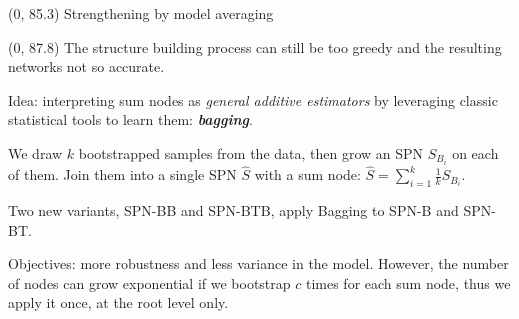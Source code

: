\documentclass[final]{beamer}
\begin{document}
\begin{frame}{}
  
  
  \begin{textblock}{80}(0, 85.3)
    Strengthening by model averaging
  \end{textblock}
  
  \begin{textblock}{25.2}(0, 87.8)
    \footnotesize
    The structure building process can still be too greedy and the
    resulting networks not so accurate.\par\bigskip
    
    Idea: interpreting sum nodes as \emph{general additive estimators}
    by leveraging
    classic statistical tools to learn them:
    \textbf{\emph{bagging}}.\par\bigskip

    We draw $k$ bootstrapped samples from the data, then grow an SPN $S_{B_i}$ on
    each of them. Join them into a single SPN $\hat{S}$ with a sum node:
    $\hat{S}=\sum_{i=1}^{k}\frac{1}{k}S_{B_{i}}$.\par\bigskip
    
    Two new variants, \textsf{SPN-BB} and
    \textsf{SPN-BTB}, apply \textsf{B}agging to \textsf{SPN-B} and \textsf{SPN-BT}.\par\bigskip

    Objectives: more robustness and less variance in the model.
    However, the number of nodes can grow exponential if we bootstrap
    $c$ times for each sum node, thus we
    apply it once, at the root level only.

    

  \end{textblock}
  

\end{frame}
\end{document}
